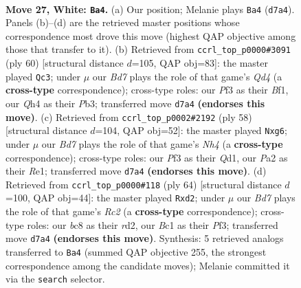 \documentclass[11pt]{article}
\begin{document}
\clearpage

\begin{figure}[p]\centering
\begin{subfigure}{0.46\textwidth}\centering
\resizebox{\linewidth}{!}{%
\newchessgame
\chessboard[
  setfen={r1b5/pppB1ppk/3n3p/3P4/7Q/2b2P1P/PPq3P1/R1B2K2 w - - 0 27},
  showmover=false,
  pgfstyle=straightmove, color=movearrow, markmove={d7-a4}
]}
\caption{}
\end{subfigure}\hfill
\begin{subfigure}{0.46\textwidth}\centering
\resizebox{\linewidth}{!}{%
\newchessgame
\chessboard[
  setfen={6k1/1b1r1p1p/2p2np1/1p2P3/3Q1P1q/1P4NP/6PK/2R2B2 w - - 3 31},
  showmover=false,
  pgfstyle=straightmove, color=movearrow, markmove={d4-c3}
]}
\caption{}
\end{subfigure}
\\[4pt]
\begin{subfigure}{0.46\textwidth}\centering
\resizebox{\linewidth}{!}{%
\newchessgame
\chessboard[
  setfen={2br1bk1/5pp1/p5np/1p6/3BB2N/1P5P/q4PP1/3QR1K1 w - - 2 30},
  showmover=false,
  pgfstyle=straightmove, color=movearrow, markmove={h4-g6}
]}
\caption{}
\end{subfigure}\hfill
\begin{subfigure}{0.46\textwidth}\centering
\resizebox{\linewidth}{!}{%
\newchessgame
\chessboard[
  setfen={2r1n1k1/1p3pp1/pBb4p/4p3/1QB1P2q/1P3P1P/1PRr2P1/6K1 w - - 0 33},
  showmover=false,
  pgfstyle=straightmove, color=movearrow, markmove={c2-d2}
]}
\caption{}
\end{subfigure}
\caption{\textbf{Move 27, White: \texttt{Ba4}.} (a) Our position; Melanie plays \texttt{Ba4} (\texttt{d7a4}). Panels (b)--(d) are the retrieved master positions whose correspondence most drove this move (highest QAP objective among those that transfer to it). (b) Retrieved from \texttt{ccrl\_top\_p0000\#3091} (ply 60) [structural distance $d$=105, QAP obj=83]: the master played \texttt{Qc3}; under $\mu$ our \emph{Bd7} plays the role of that game's \emph{Qd4} (a \textbf{cross-type} correspondence); cross-type roles: our \emph{P}f3 as their \emph{B}f1, our \emph{Q}h4 as their \emph{P}b3; transferred move \texttt{d7a4} \textbf{(endorses this move)}. (c) Retrieved from \texttt{ccrl\_top\_p0002\#2192} (ply 58) [structural distance $d$=104, QAP obj=52]: the master played \texttt{Nxg6}; under $\mu$ our \emph{Bd7} plays the role of that game's \emph{Nh4} (a \textbf{cross-type} correspondence); cross-type roles: our \emph{P}f3 as their \emph{Q}d1, our \emph{P}a2 as their \emph{R}e1; transferred move \texttt{d7a4} \textbf{(endorses this move)}. (d) Retrieved from \texttt{ccrl\_top\_p0000\#118} (ply 64) [structural distance $d$=100, QAP obj=44]: the master played \texttt{Rxd2}; under $\mu$ our \emph{Bd7} plays the role of that game's \emph{Rc2} (a \textbf{cross-type} correspondence); cross-type roles: our \emph{b}c8 as their \emph{r}d2, our \emph{B}c1 as their \emph{P}f3; transferred move \texttt{d7a4} \textbf{(endorses this move)}. Synthesis: 5 retrieved analogs transferred to \texttt{Ba4} (summed QAP objective 255, the strongest correspondence among the candidate moves); Melanie committed it via the \texttt{search} selector.}
\label{fig:thought-m52}
\end{figure}
\end{document}
